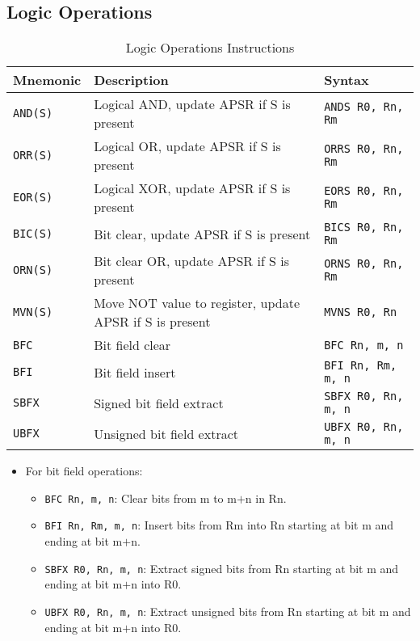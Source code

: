 \documentclass[a4paper,12pt,openany]{book}
\begin{document}
\subsection{Logic Operations}
\begin{table}[H]
    \centering
    \begin{tabular}{@{}lll@{}}
        \toprule
        Mnemonic & Description & Syntax \\
        \midrule
        \texttt{AND(S)} & Logical AND, update APSR if S is present & \texttt{ANDS R0, Rn, Rm} \\
        \texttt{ORR(S)} & Logical OR, update APSR if S is present & \texttt{ORRS R0, Rn, Rm} \\
        \texttt{EOR(S)} & Logical XOR, update APSR if S is present & \texttt{EORS R0, Rn, Rm} \\
        \texttt{BIC(S)} & Bit clear, update APSR if S is present & \texttt{BICS R0, Rn, Rm} \\
        \texttt{ORN(S)} & Bit clear OR, update APSR if S is present & \texttt{ORNS R0, Rn, Rm} \\
        \texttt{MVN(S)} & Move NOT value to register, update APSR if S is present & \texttt{MVNS R0, Rn} \\
        \texttt{BFC} & Bit field clear & \texttt{BFC Rn, m, n} \\
        \texttt{BFI} & Bit field insert & \texttt{BFI Rn, Rm, m, n} \\
        \texttt{SBFX} & Signed bit field extract & \texttt{SBFX R0, Rn, m, n} \\
        \texttt{UBFX} & Unsigned bit field extract & \texttt{UBFX R0, Rn, m, n} \\
        \bottomrule
    \end{tabular}
    \label{tab:logic_operations_instructions}
    \caption{Logic Operations Instructions}
\end{table}
\begin{itemize}
    \item For bit field operations:
    \begin{itemize}
        \item \texttt{BFC Rn, m, n}: Clear bits from m to m$+$n in Rn.
        \item \texttt{BFI Rn, Rm, m, n}: Insert bits from Rm into Rn starting at bit m and ending at bit m$+$n.
        \item \texttt{SBFX R0, Rn, m, n}: Extract signed bits from Rn starting at bit m and ending at bit m$+$n into R0.
        \item \texttt{UBFX R0, Rn, m, n}: Extract unsigned bits from Rn starting at bit m and ending at bit m$+$n into R0.
    \end{itemize}
\end{itemize}
\end{document}
